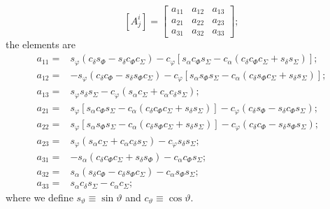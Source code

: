 \begin{equation}
\left[A^i_j\right] = \begin{bmatrix}
a_{11} & a_{12} & a_{13} \\
a_{21} & a_{22} & a_{23} \\
a_{31} & a_{32} & a_{33}
\end{bmatrix};
\end{equation}
the elements are
\begin{align}
a_{11} = {} & s_\varphi\left(c_\delta s_\Phi - s_\delta c_\Phi c_\Sigma\right) - c_\varphi \left[s_\alpha c_\Phi s_\Sigma - c_\alpha \left(c_\delta c_\Phi c_\Sigma + s_\delta s_\Sigma\right)\right]; \\
a_{12} = {} & -s_\varphi\left(c_\delta c_\Phi - s_\delta s_\Phi c_\Sigma\right) - c_\varphi \left[s_\alpha s_\Phi s_\Sigma - c_\alpha \left(c_\delta s_\Phi c_\Sigma + s_\delta s_\Sigma\right)\right]; \\
a_{13} = {} & s_\varphi s_\delta s_\Sigma - c_\varphi\left(s_\alpha c_\Sigma + c_\alpha c_\delta s_\Sigma\right); \\
a_{21} = {} & s_\varphi\left[s_\alpha c_\Phi s_\Sigma - c_\alpha \left(c_\delta c_\Phi c_\Sigma + s_\delta s_\Sigma\right)\right] - c_\varphi \left(c_\delta s_\Phi - s_\delta c_\Phi s_\Sigma\right); \\
a_{22} = {} & s_\varphi\left[s_\alpha s_\Phi s_\Sigma - c_\alpha \left(c_\delta s_\Phi c_\Sigma + s_\delta s_\Sigma\right)\right] - c_\varphi \left(c_\delta c_\Phi - s_\delta s_\Phi s_\Sigma\right); \\
a_{23} = {} & s_\varphi\left(s_\alpha c_\Sigma + c_\alpha c_\delta s_\Sigma\right) - c_\varphi s_\delta s_\Sigma; \\
a_{31} = {} & -s_\alpha\left(c_\delta c_\Phi c_\Sigma + s_\delta s_\Phi\right) - c_\alpha c_\Phi s_\Sigma; \\
a_{32} = {} & s_\alpha\left(s_\delta c_\Phi - c_\delta s_\Phi c_\Sigma\right) - c_\alpha s_\Phi s_\Sigma; \\
a_{33} = {} & s_\alpha c_\delta s_\Sigma - c_\alpha c_\Sigma;
\end{align}
where we define $s_\vartheta \equiv \sin \vartheta$ and $c_\vartheta \equiv \cos \vartheta$.

